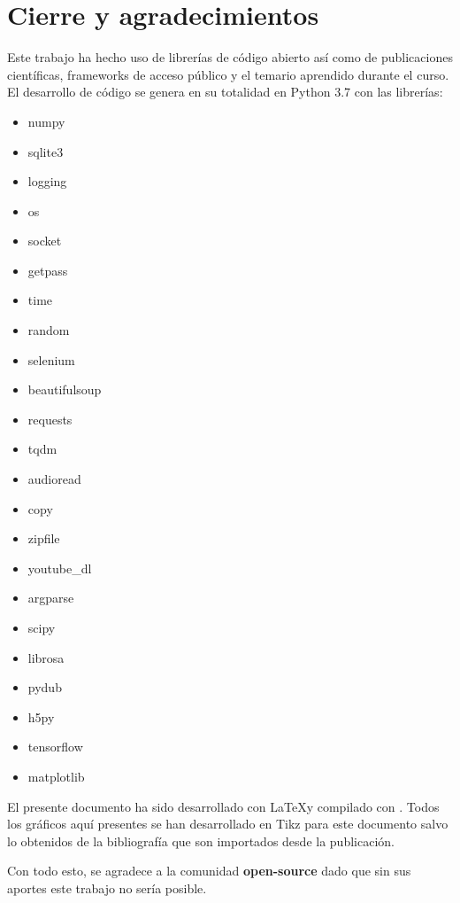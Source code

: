 \section{Cierre y agradecimientos}
Este trabajo ha hecho uso de librerías de código abierto así como de publicaciones científicas, frameworks de acceso público y el temario aprendido durante el curso. El desarrollo de código se genera en su totalidad en Python 3.7 con las librerías:
\begin{itemize}
	\item numpy
	\item sqlite3
	\item logging
	\item os
	\item socket
	\item getpass
	\item time
	\item random
	\item selenium
	\item beautifulsoup
	\item requests
	\item tqdm
	\item audioread
	\item copy
	\item zipfile
	\item youtube\_dl
	\item argparse
	\item scipy
	\item librosa
	\item pydub
	\item h5py
	\item tensorflow
	\item matplotlib
\end{itemize}

El presente documento ha sido desarrollado con \LaTeX y compilado con \XeLaTeX. Todos los gráficos aquí presentes se han desarrollado en Tikz para este documento salvo lo obtenidos de la bibliografía \cite{rnnoise} que son importados desde la publicación.

Con todo esto, se agradece a la comunidad \textbf{open-source} dado que sin sus aportes este trabajo no sería posible.